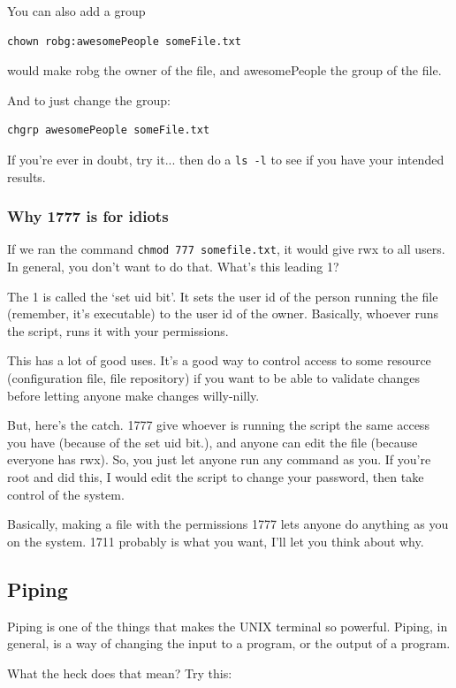 You can also add a group
\begin{verbatim}chown robg:awesomePeople someFile.txt \end{verbatim}
would make robg the owner of the file, and awesomePeople the group of the file.

And to just change the group:
\begin{verbatim}chgrp awesomePeople someFile.txt \end{verbatim}
	
If you're ever in doubt, try it... then do a {\tt ls -l} to see if you have your intended results.

\subsubsection{Why 1777 is for idiots}

If we ran the command {\tt chmod 777 somefile.txt}, it would give rwx to all users. In general, you don't
want to do that. What's this leading 1?

The 1 is called the `set uid bit'. It sets the user id of the person running the file (remember, it's executable) to the
user id of the owner. Basically, whoever runs the script, runs it with your permissions.

This has a lot of good uses. It's a good way to control access to some resource (configuration file, file repository) if you want
to be able to validate changes before letting anyone make changes willy-nilly. 

But, here's the catch.  1777 give whoever is running the script the same access you have (because of the set uid bit.), 
and anyone can edit the file (because everyone has rwx). So, you just let anyone run any command as you. If you're root 
and did this, I would edit the script to change your password, then take control of the system. 

Basically, making a file with the permissions 1777 lets anyone do anything as you on the system. 1711 probably is what you want,
I'll let you think about why.

\subsection {Piping}
Piping is one of the things that makes the UNIX terminal so powerful. Piping,
in general, is a way of changing the input to a program, or the output of a program.

What the heck does that mean? Try this:

